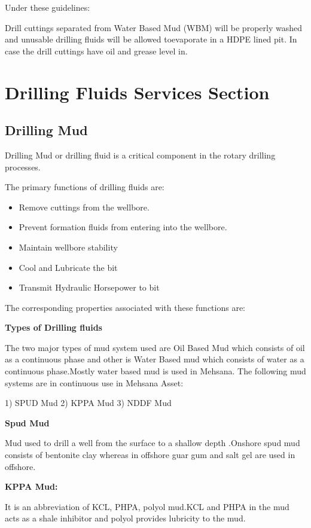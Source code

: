 \documentclass[11pt,a4paper]{article}
\begin{document}
Under these guidelines:

Drill cuttings separated from Water Based Mud (WBM) will be properly washed and unusable drilling fluids will be allowed toevaporate in a HDPE lined pit. In case the drill cuttings have oil and grease level in.

\section{\textbf{Drilling Fluids Services Section}}

\subsection{\textbf{Drilling Mud}}
	
Drilling Mud or drilling fluid is a critical component in the rotary drilling processes.

The primary functions of drilling fluids are:

\begin{itemize}

\item Remove cuttings from the wellbore.
\item Prevent formation fluids from entering into the wellbore.
\item Maintain wellbore stability
\item Cool and Lubricate the bit
\item Transmit Hydraulic Horsepower to bit

\end{itemize}

The corresponding properties associated with these functions are:
%
%
%
%

\textbf{Types of Drilling fluids}

The two major types of mud system used are Oil Based Mud which consists of oil as a continuous phase and other is Water Based mud which consists of water as a continuous phase.Mostly water based mud is used in Mehsana. The following mud systems are in continuous use in Mehsana Asset:

1) SPUD Mud
2) KPPA Mud
3) NDDF Mud

\textbf{Spud Mud}

Mud used to drill a well from the surface to a shallow depth .Onshore spud mud consists of bentonite clay whereas in offshore guar gum and salt gel are used in offshore.

\textbf{KPPA Mud:}

It is an abbreviation of KCL, PHPA, polyol mud.KCL and PHPA in the mud acts as a shale inhibitor and polyol provides lubricity to the mud.
\end{document}
